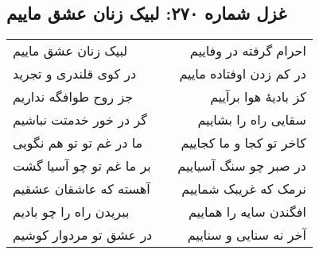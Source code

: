 \begin{center}
\section*{غزل شماره ۲۷۰: لبیک زنان عشق ماییم}
\label{sec:270}
\begin{longtable}{l p{0.5cm} r}
لبیک زنان عشق ماییم
&&
احرام گرفته در وفاییم
\\
در کوی قلندری و تجرید
&&
در کم زدن اوفتاده ماییم
\\
جز روح طوافگه نداریم
&&
کز بادیهٔ هوا برآییم
\\
گر در خور خدمتت نباشیم
&&
سقایی راه را بشاییم
\\
ما در غم تو تو هم نگویی
&&
کاخر تو کجا و ما کجاییم
\\
بر ما غم تو چو آسیا گشت
&&
در صبر چو سنگ آسیاییم
\\
آهسته که عاشقان عشقیم
&&
نرمک که غریبک شماییم
\\
ببریدن راه را چو بادیم
&&
افگندن سایه را هماییم
\\
در عشق تو مردوار کوشیم
&&
آخر نه سنایی و سناییم
\\
\end{longtable}
\end{center}
